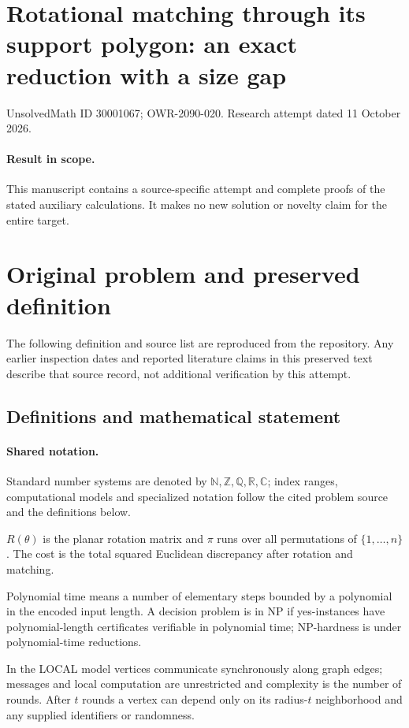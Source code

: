 \documentclass[11pt]{article}
\begin{document}
\section*{Rotational matching through its support polygon: an exact reduction with a size gap}
\noindent UnsolvedMath ID 30001067; OWR-2090-020. Research attempt dated 11 October 2026.
\paragraph{Result in scope.}This manuscript contains a source-specific attempt and complete proofs of the stated auxiliary calculations. It makes no new solution or novelty claim for the entire target.
\section{Original problem and preserved definition}
The following definition and source list are reproduced from the repository. Any earlier inspection dates and reported literature claims in this preserved text describe that source record, not additional verification by this attempt.
\subsection{Definitions and mathematical statement}

\paragraph{Shared notation.}Standard number systems are denoted by $\mathbb N,\mathbb Z,\mathbb Q,\mathbb R,\mathbb C$; index ranges, computational models and specialized notation follow the cited problem source and the definitions below.


$R(\theta)$ is the planar rotation matrix and $\pi$ runs over all permutations of $\{1,\ldots,n\}$. The cost is the total squared Euclidean discrepancy after rotation and matching.

Polynomial time means a number of elementary steps bounded by a polynomial in the encoded input length. A decision problem is in $\mathrm{NP}$ if yes-instances have polynomial-length certificates verifiable in polynomial time; NP-hardness is under polynomial-time reductions.

In the LOCAL model vertices communicate synchronously along graph edges; messages and local computation are unrestricted and complexity is the number of rounds. After $t$ rounds a vertex can depend only on its radius-$t$ neighborhood and any supplied identifiers or randomness.
\end{document}
